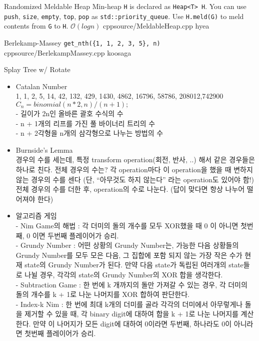 \documentclass[landscape, 10pt, a4paper, oneside, twocolumn]{extarticle}
\begin{document}
\Algorithm
{Randomized Meldable Heap}
{Min-heap \texttt{H} is declared as \texttt{Heap<T> H}. You can use \texttt{push}, \texttt{size}, \texttt{empty}, \texttt{top}, \texttt{pop} as \texttt{std::priority\_queue}. Use \texttt{H.meld(G)} to meld contents from \texttt{G} to \texttt{H}. }
{$\mathcal{O}(log n)$}
{cpp}{source/MeldableHeap.cpp}
{hyea}

\Algorithm
{Berlekamp-Massey}
{\texttt{get\_nth(\{1, 1, 2, 3, 5\}, n)}}
{}
{cpp}{source/BerlekampMassey.cpp}
{koosaga}

\Algorithm
{Splay Tree w/ Rotate}
{}
{}
{}
{}
{}


\begin{itemize}
\item Catalan Number\\
1, 1, 2, 5, 14, 42, 132, 429, 1430, 4862, 16796, 58786, 208012,742900\\
$C_n = binomial(n * 2, n) / (n + 1);$\\
- 길이가 2n인 올바른 괄호 수식의 수\\
- n + 1개의 리프를 가진 풀 바이너리 트리의 수\\
- n + 2각형을 n개의 삼각형으로 나누는 방법의 수
\item Burnside’s Lemma\\
경우의 수를 세는데, 특정 transform operation(회전, 반사, ..) 해서 같은 경우들은 하나로 친다. 전체 경우의 수는? 각 operation마다 이 operation을 했을 때 변하지 않는 경우의 수를 센다 (단, “아무것도 하지 않는다” 라는 operation도 있어야 함!) 전체 경우의 수를 더한 후, operation의 수로 나눈다. (답이 맞다면 항상 나누어 떨어져야 한다)
\item 알고리즘 게임\\
- Nim Game의 해법 : 각 더미의 돌의 개수를 모두 XOR했을 때 0 이 아니면 첫번째, 0 이면 두번째 플레이어가 승리.\\
- Grundy Number : 어떤 상황의 Grundy Number는, 가능한 다음 상황들의 Grundy Number를 모두 모은 다음, 그 집합에 포함 되지 않는 가장 작은 수가 현재 state의 Grundy Number가 된다. 만약 다음 state가 독립된 여러개의 state들로 나뉠 경우, 각각의 state의 Grundy Number의 XOR 합을 생각한다.\\
- Subtraction Game : 한 번에 k 개까지의 돌만 가져갈 수 있는 경우, 각 더미의 돌의 개수를 k + 1로 나눈 나머지를 XOR 합하여 판단한다.\\
- Index-k Nim : 한 번에 최대 k개의 더미를 골라 각각의 더미에서 아무렇게나 돌을 제거할 수 있을 때, 각 binary digit에 대하여 합을 k + 1로 나눈 나머지를 계산한다. 만약 이 나머지가 모든 digit에 대하여 0이라면 두번째, 하나라도 0이 아니라면 첫번째 플레이어가 승리.

\end{itemize}
\end{document}

